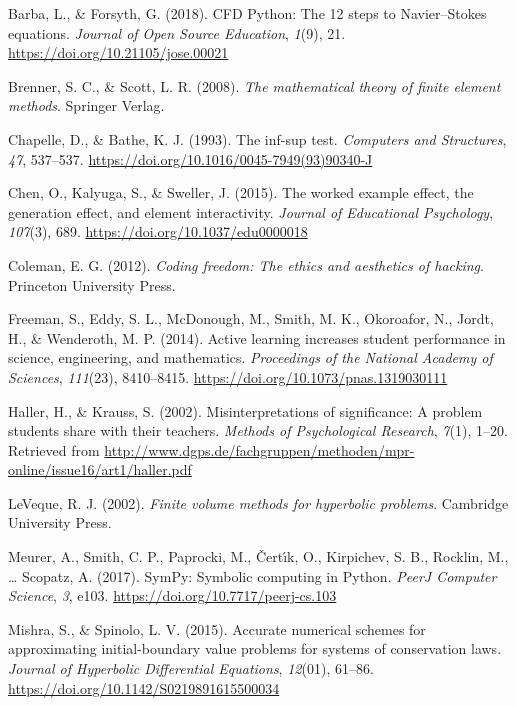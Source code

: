 \documentclass[]{book}
\begin{document}
\hypertarget{refs}{}
\leavevmode\hypertarget{ref-barbacfd}{}%
Barba, L., \& Forsyth, G. (2018). CFD Python: The 12 steps to Navier--Stokes equations. \emph{Journal of Open Source Education}, \emph{1}(9), 21. \url{https://doi.org/10.21105/jose.00021}

\leavevmode\hypertarget{ref-brenner2008mathematical}{}%
Brenner, S. C., \& Scott, L. R. (2008). \emph{The mathematical theory of finite element methods}. Springer Verlag.

\leavevmode\hypertarget{ref-chapelle1993inf}{}%
Chapelle, D., \& Bathe, K. J. (1993). The inf-sup test. \emph{Computers and Structures}, \emph{47}, 537--537. \url{https://doi.org/10.1016/0045-7949(93)90340-J}

\leavevmode\hypertarget{ref-chen2015worked}{}%
Chen, O., Kalyuga, S., \& Sweller, J. (2015). The worked example effect, the generation effect, and element interactivity. \emph{Journal of Educational Psychology}, \emph{107}(3), 689. \url{https://doi.org/10.1037/edu0000018}

\leavevmode\hypertarget{ref-coleman2012coding}{}%
Coleman, E. G. (2012). \emph{Coding freedom: The ethics and aesthetics of hacking}. Princeton University Press.

\leavevmode\hypertarget{ref-freeman2014active}{}%
Freeman, S., Eddy, S. L., McDonough, M., Smith, M. K., Okoroafor, N., Jordt, H., \& Wenderoth, M. P. (2014). Active learning increases student performance in science, engineering, and mathematics. \emph{Proceedings of the National Academy of Sciences}, \emph{111}(23), 8410--8415. \url{https://doi.org/10.1073/pnas.1319030111}

\leavevmode\hypertarget{ref-HallerKrauss2002}{}%
Haller, H., \& Krauss, S. (2002). Misinterpretations of significance: A problem students share with their teachers. \emph{Methods of Psychological Research}, \emph{7}(1), 1--20. Retrieved from \url{http://www.dgps.de/fachgruppen/methoden/mpr-online/issue16/art1/haller.pdf}

\leavevmode\hypertarget{ref-leveque2002finite}{}%
LeVeque, R. J. (2002). \emph{Finite volume methods for hyperbolic problems}. Cambridge University Press.

\leavevmode\hypertarget{ref-Meurer2017}{}%
Meurer, A., Smith, C. P., Paprocki, M., Čertı́k, O., Kirpichev, S. B., Rocklin, M., \ldots{} Scopatz, A. (2017). SymPy: Symbolic computing in Python. \emph{PeerJ Computer Science}, \emph{3}, e103. \url{https://doi.org/10.7717/peerj-cs.103}

\leavevmode\hypertarget{ref-mishra2015accurate}{}%
Mishra, S., \& Spinolo, L. V. (2015). Accurate numerical schemes for approximating initial-boundary value problems for systems of conservation laws. \emph{Journal of Hyperbolic Differential Equations}, \emph{12}(01), 61--86. \url{https://doi.org/10.1142/S0219891615500034}
\end{document}
